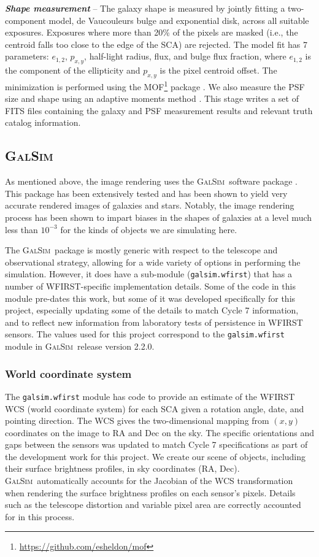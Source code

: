 \documentclass[aps,prd, amsmath,amssymb,superscriptaddress,showkeys,nofootinbib,reprint,preprintnumbers]{revtex4-1}
\newcommand{\galsim}{\textsc{GalSim}}
\begin{document}
\textbf{\textit{Shape measurement}} -- 
The galaxy shape is measured by jointly fitting a two-component model, de Vaucouleurs bulge and exponential disk, across all suitable exposures. 
Exposures where more than 20\% of the pixels are masked (i.e., the centroid falls too close to the edge of the SCA) are rejected. 
The model fit has 7 parameters: $e_{1,2}$, $p_{x,y}$, half-light radius, flux, and bulge flux fraction, where $e_{1,2}$ is the component of the ellipticity and $p_{x,y}$ is the pixel centroid offset. 
The minimization is performed using the \textsc{MOF}\footnote{\url{https://github.com/esheldon/mof}} package \cite{2014MNRAS.444L..25S}. 
We also measure the PSF size and shape using an adaptive moments method \cite{2003MNRAS.343..459H}. 
This stage writes a set of FITS files containing the galaxy and PSF measurement results and relevant truth catalog information.

\subsection{\galsim}

As mentioned above, the image rendering uses the \galsim\ software package \cite{Rowe15}.  
This package has been extensively tested and has been shown to yield very accurate rendered images of galaxies and stars.
Notably, the image rendering process has been shown to impart biases in the shapes of galaxies at a level much less than $10^{-3}$ for the kinds of objects we are simulating here.  

The \galsim\ package is mostly generic with respect to the telescope and observational strategy, allowing for a wide variety of options in performing the simulation.
However, it does have a sub-module (\texttt{galsim.wfirst}) that has a number of WFIRST-specific implementation details.
Some of the code in this module pre-dates this work, but some of it was developed specifically for this project, especially updating some of the details to match Cycle 7 information, and to reflect new information from laboratory tests of persistence in WFIRST sensors.  
The values used for this project correspond to the \texttt{galsim.wfirst} module in \galsim\ release version 2.2.0.

\subsubsection{World coordinate system}\label{wcs}

The \texttt{galsim.wfirst} module has code to provide an estimate of the WFIRST WCS (world coordinate system) for each SCA given a rotation angle, date, and pointing direction.  
The WCS gives the two-dimensional mapping from $(x,y)$ coordinates on the image to RA and Dec on the sky.
The specific orientations and gaps between the sensors was updated to match Cycle 7 specifications as part of the development work for this project.
We create our scene of objects, including their surface brightness profiles, in sky coordinates (RA, Dec).
\galsim\ automatically accounts for the Jacobian of the WCS transformation when rendering the surface brightness profiles on each sensor's pixels.  
Details such as the telescope distortion and variable pixel area are correctly accounted for in this process.
\end{document}
